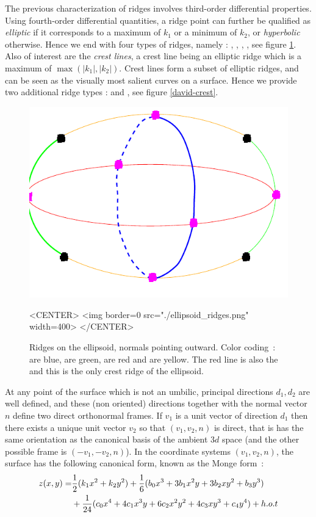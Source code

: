 The previous characterization of ridges involves third-order
differential properties. Using fourth-order differential quantities, a
ridge point can further be qualified as {\em elliptic} if it
corresponds to a maximum of $k_1$ or a minimum of $k_2$, or {\em
hyperbolic} otherwise. Hence we end with four types of ridges, namely
: , , ,
, see figure \ref{ellipsoid-ridges}.
Also of interest are the {\em crest lines}, a crest line being an
elliptic ridge which is a maximum of $\max(|k_1|,|k_2|)$. Crest lines
form a subset of elliptic ridges, and can be seen as the visually most
salient curves on a surface.
Hence we provide two additional ridge types :
 and , see figure \ref{david-crest}.

\begin{figure}[!ht]
\begin{ccTexOnly}
\centerline{
\includegraphics[width=.5\linewidth]{Ridges_3/ellipsoid_ridges}}
\end{ccTexOnly}

\begin{ccHtmlOnly}
<CENTER> <img border=0 src="./ellipsoid_ridges.png" width=400>
</CENTER>
\end{ccHtmlOnly}
\caption{Ridges on the ellipsoid, normals pointing outward.  Color
  coding~:  are blue,
   are green,  are
  red and  are yellow. The red line is also
  the  and this is the only crest ridge of the
  ellipsoid.}
\label{ellipsoid-ridges}
\end{figure}

At any point of the surface which is not an umbilic, principal
directions $d_1, d_2$ are well defined, and these (non oriented)
directions together with the normal vector $n$ define two direct
orthonormal frames. If $v_1$ is a unit vector of direction $d_1$ then
there exists a unique unit vector $v_2$ so that $(v_1,v_2,n)$ is
direct, that is has the same orientation as the canonical basis of the
ambient $3d$ space (and the other possible frame is $(-v_1,-v_2,n)$). In the
coordinate systems $(v_1,v_2,n)$, the surface has the following
canonical form, known as the Monge form~:
%
\begin{eqnarray}
\label{eq:monge}
z(x,y) =  & \frac{1}{2}(k_1x^2 + k_2y^2)+
	\frac{1}{6}(b_0x^3+3b_1x^2y+3b_2xy^2+b_3y^3) \\
  &  +\frac{1}{24}(c_0x^4+4c_1x^3y+6c_2x^2y^2+4c_3xy^3+c_4y^4) + h.o.t
\end{eqnarray}

